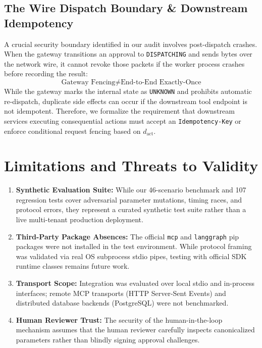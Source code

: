 \documentclass[sigconf,anonymous,review]{acmart}
\begin{document}
\subsection{The Wire Dispatch Boundary \& Downstream Idempotency}
A crucial security boundary identified in our audit involves post-dispatch crashes. When the gateway transitions an approval to \texttt{DISPATCHING} and sends bytes over the network wire, it cannot revoke those packets if the worker process crashes before recording the result:
\begin{equation}
\text{Gateway Fencing} \neq \text{End-to-End Exactly-Once}
\end{equation}
While the gateway marks the internal state as \texttt{UNKNOWN} and prohibits automatic re-dispatch, duplicate side effects can occur if the downstream tool endpoint is not idempotent. Therefore, we formalize the requirement that downstream services executing consequential actions must accept an \texttt{Idempotency-Key} or enforce conditional request fencing based on $d_{\text{act}}$.

\section{Limitations and Threats to Validity}
\begin{enumerate}
    \item \textbf{Synthetic Evaluation Suite:} While our 46-scenario benchmark and 107 regression tests cover adversarial parameter mutations, timing races, and protocol errors, they represent a curated synthetic test suite rather than a live multi-tenant production deployment.
    \item \textbf{Third-Party Package Absences:} The official \texttt{mcp} and \texttt{langgraph} pip packages were not installed in the test environment. While protocol framing was validated via real OS subprocess stdio pipes, testing with official SDK runtime classes remains future work.
    \item \textbf{Transport Scope:} Integration was evaluated over local stdio and in-process interfaces; remote MCP transports (HTTP Server-Sent Events) and distributed database backends (PostgreSQL) were not benchmarked.
    \item \textbf{Human Reviewer Trust:} The security of the human-in-the-loop mechanism assumes that the human reviewer carefully inspects canonicalized parameters rather than blindly signing approval challenges.
\end{enumerate}
\end{document}
